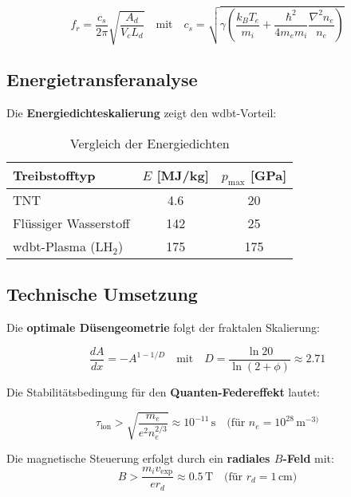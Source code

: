 \begin{equation}
f_r = \frac{c_s}{2\pi}\sqrt{\frac{A_d}{V_c L_d}} \quad \text{mit} \quad c_s = \sqrt{\gamma \left(\frac{k_B T_e}{m_i} + \frac{\hbar^2}{4m_e m_i}\frac{\nabla^2 n_e}{n_e}\right)}
\label{eq:resonanz}
\end{equation}

\subsection{Energietransferanalyse}
\label{subsec:energie}

Die \textbf{Energiedichteskalierung} zeigt den \gls{wdbt}-Vorteil:

\begin{table}[h]
\centering
\caption{Vergleich der Energiedichten}
\label{tab:energie}
\begin{tabular}{lcc}
\toprule
Treibstofftyp & $E$ [MJ/kg] & $p_{\text{max}}$ [GPa] \\
\midrule
TNT & 4.6 & 20 \\
Flüssiger Wasserstoff & 142 & 25 \\
\gls{wdbt}-Plasma (LH$_2$) & 175 & 175 \\
\bottomrule
\end{tabular}
\end{table}

\subsection{Technische Umsetzung}
\label{subsec:tech}

Die \textbf{optimale Düsengeometrie} folgt der fraktalen Skalierung:

\begin{equation}
\frac{dA}{dx} = -A^{1-1/D} \quad \text{mit} \quad D = \frac{\ln 20}{\ln(2+\phi)} \approx 2.71
\label{eq:duese}
\end{equation}

Die Stabilitätsbedingung für den \textbf{Quanten-Federeffekt} lautet:

\begin{equation}
\tau_{\text{ion}} > \sqrt{\frac{m_e}{e^2 n_e^{2/3}}} \approx 10^{-11}\,\text{s}\quad\text{(für }n_e=10^{28}\,\text{m}^{-3)}
\end{equation}

\begin{remark}
Die magnetische Steuerung erfolgt durch ein \textbf{radiales $B$-Feld} mit:
\[
B > \frac{m_i v_{\text{exp}}}{e r_d} \approx 0.5\,\text{T}\quad\text{(für }r_d=1\,\text{cm)}
\]
\end{remark}

